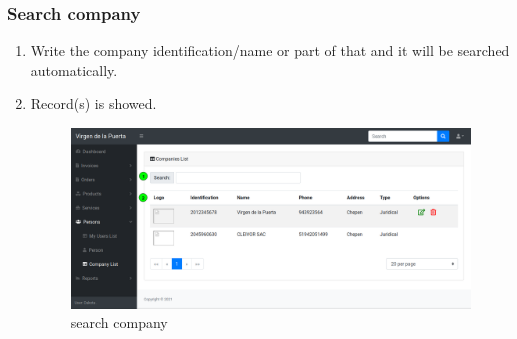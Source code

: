 \documentclass[a4paper,11pt]{refart}
\begin{document}
\subsubsection{Search company}\label{section:company_search}
\begin{enumerate}
	\item Write the company identification/name or part of that and it will be searched automatically.
	\item Record(s) is showed.
	\begin{figure}[H]\centering
		\includegraphics[width=\textwidth]{images/company_list-search.png}
		\caption{search company}
		\label{fig:company_list-search}
	\end{figure}
\end{enumerate}
\end{document}
